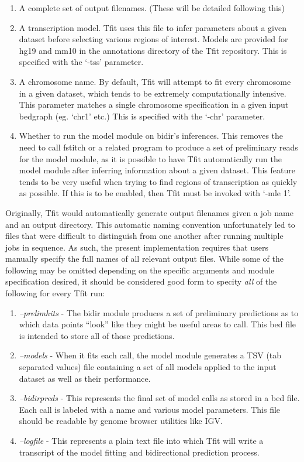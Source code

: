 \documentclass[12pt,letterpaper]{article}
\begin{document}
\begin{enumerate}
\item A complete set of output filenames. (These will be detailed following this)
\item A transcription model. Tfit uses this file to infer parameters about a given dataset before selecting various regions of interest. Models are provided for hg19 and mm10 in the annotations directory of the Tfit repository. This is specified with the `-tss' parameter.
\item A chromosome name. By default, Tfit will attempt to fit every chromosome in a given dataset, which tends to be extremely computationally intensive. This parameter matches a single chromosome specification in a given input bedgraph (eg. `chr1' etc.) This is specified with the `-chr' parameter.
\item Whether to run the model module on bidir's inferences. This removes the need to call fstitch or a related program to produce a set of preliminary reads for the model module, as it is possible to have Tfit automatically run the model module after inferring information about a given dataset. This feature tends to be very useful when trying to find regions of transcription as quickly as possible. If this is to be enabled, then Tfit must be invoked with `-mle 1'.
\end{enumerate}

Originally, Tfit would automatically generate output filenames given a job name and an output directory. This automatic naming convention unfortunately led to files that were difficult to distinguish from one another after running multiple jobs in sequence. As such, the present implementation requires that users manually specify the full names of all relevant output files. While some of the following may be omitted depending on the specific arguments and module specification desired, it should be considered good form to specity \textit{all} of the following for every Tfit run:

\begin{enumerate}
\item \textit{--prelimhits} - The bidir module produces a set of preliminary predictions as to which data points ``look'' like they might be useful areas to call. This bed file is intended to store all of those predictions.
\item \textit{--models} - When it fits each call, the model module generates a TSV (tab separated values) file containing a set of all models applied to the input dataset as well as their performance. 
\item \textit{--bidirpreds} - This represents the final set of model calls as stored in a bed file. Each call is labeled with a name and various model parameters. This file should be readable by genome browser utilities like IGV.
\item \textit{--logfile} - This represents a plain text file into which Tfit will write a transcript of the model fitting and bidirectional prediction process. 
\end{enumerate}
\end{document}
